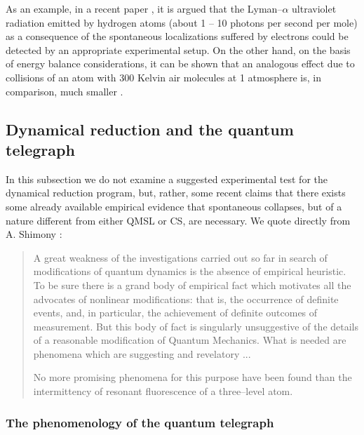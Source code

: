 \documentclass[10pt,a4paper]{article}
\begin{document}
As an example, in a recent paper \cite{prc}, it is argued that the
Lyman--$\alpha$ ultraviolet radiation emitted by hydrogen atoms
(about 1 -- 10 photons per second per mole) as a consequence of
the spontaneous localizations suffered by electrons could be
detected by an appropriate experimental setup. On the other hand,
on the basis of energy balance considerations, it can be shown
that an analogous effect due to collisions of an atom with 300
Kelvin air molecules at 1 atmosphere is, in
comparison, much smaller .


\subsection{Dynamical reduction and the quantum telegraph}
\label{sec152}

In this subsection we do not examine a suggested experimental test
for the dynamical reduction program, but, rather, some recent
claims that there exists some already available empirical evidence
that spontaneous collapses, but of a nature
different from either QMSL or CS, are necessary. We quote directly from
A. Shimony \cite{shi90}:
\begin{quotation}
A great weakness of the investigations carried out so far in
search of modifications of quantum dynamics is the absence of
empirical heuristic. To be sure there is a grand body of empirical
fact which motivates all the advocates of nonlinear modifications:
that is, the occurrence of definite events, and, in particular,
the achievement of definite outcomes of measurement. But this body
of fact is singularly unsuggestive of the details of a reasonable
modification of Quantum Mechanics. What is needed are phenomena
which are suggesting and revelatory ...

No more promising phenomena for this purpose have been found than
the intermittency of resonant fluorescence of a three--level atom.
\end{quotation}

\subsubsection{The phenomenology of the quantum telegraph}
\label{sec1521}
\end{document}
